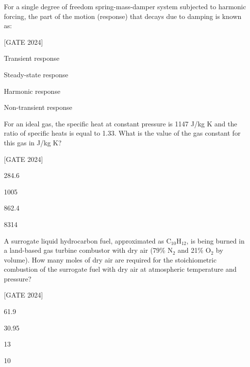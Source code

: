     \item For a single degree of freedom spring-mass-damper system subjected to harmonic forcing, the part of the motion (response) that decays due to damping is known as:

        \hfill{[GATE 2024]}\begin{enumerate}    \begin{multicols}{2}
            \item Transient response
            \item Steady-state response
            \item Harmonic response
            \item Non-transient response
      \end{multicols}  \end{enumerate}
    

    \item For an ideal gas, the specific heat at constant pressure is 1147 J/kg K and the ratio of specific heats is equal to 1.33. What is the value of the gas constant for this gas in J/kg K?
   
        \hfill{[GATE 2024]}\begin{enumerate} \begin{multicols}{4}
            \item 284.6
            \item 1005
            \item 862.4
            \item 8314
       \end{multicols}
 \end{enumerate}
    
    \item A surrogate liquid hydrocarbon fuel, approximated as C$_{10}$H$_{12}$, is being burned in a land-based gas turbine combustor with dry air (79\% N$_2$ and 21\% O$_2$ by volume). How many moles of dry air are required for the stoichiometric combustion of the surrogate fuel with dry air at atmospheric temperature and pressure?
   
        \hfill{[GATE 2024]}\begin{enumerate} \begin{multicols}{4}
            \item 61.9
            \item 30.95
            \item 13
            \item 10
     \end{multicols}   \end{enumerate}
    

